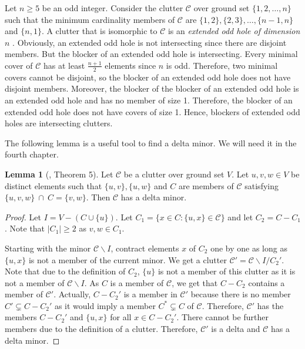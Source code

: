 \documentclass[a4paper, 12pt]{scrbook}
\theoremstyle{definition}
\newtheorem{lemma}[theorem]{Lemma}
\begin{document}
Let $n\geq 5$ be an odd integer.
Consider the clutter $\mathcal{C}$ over ground set $\{1,2,\ldots,n\}$ such that the minimum cardinality members of $\mathcal{C}$ are $\{1,2\},\{2,3\},\ldots,\{n-1,n\}$ and $\{n,1\}$.
A clutter that is isomorphic to $\mathcal{C}$ is an \emph{extended odd hole of dimension $n$} \cite{deltas}.
Obviously, an extended odd hole is not intersecting since there are disjoint members.
But the blocker of an extended odd hole is intersecting.
Every minimal cover of $\mathcal{C}$ has at least $\frac{n+1}2$ elements since $n$ is odd.
Therefore, two minimal covers cannot be disjoint, so the blocker of an extended odd hole does not have disjoint members.
Moreover, the blocker of the blocker of an extended odd hole is an extended odd hole and has no member of size 1.
Therefore, the blocker of an extended odd hole does not have covers of size 1.
Hence, blockers of extended odd holes are intersecting clutters.
\newline

The following lemma is a useful tool to find a delta minor. We will need it in the fourth chapter.
\begin{lemma}[\cite{deltas}, Theorem 5]\label{finddelta}
    Let $\mathcal{C}$ be a clutter over ground set $V$. Let $u,v,w \in V$ be distinct elements such that $\{u,v\}, \{u,w\}$ and $C$ are members of $\mathcal{C}$ satisfying $\{u,v,w\}~\cap~C = \{v,w\}$. Then $\mathcal{C}$ has a delta minor.
\end{lemma}

\begin{proof}
    Let $I=V-(C \cup \{u\})$. Let $C_1 = \{x \in C: \{u,x\} \in \mathcal{C}\}$ and let $C_2=C-C_1$. Note that $|C_1|\geq 2$ as $v,w \in C_1$.

    Starting with the minor $\mathcal{C} \backslash I$, contract elements $x$ of $C_2$ one by one as long as $\{u,x\}$ is not a member of the current minor.
    We get a clutter $\mathcal{C'}=\mathcal{C} \backslash I/C_2'$.
    Note that due to the definition of $C_2$, $\{u\}$ is not a member of this clutter as it is not a member of $\mathcal{C} \backslash I$.
    As $C$ is a member of $\mathcal{C}$, we get that $C-C_2$ contains a member of $\mathcal{C'}$.
    Actually, $C-C_2'$ is a member in $\mathcal{C'}$ because there is no member $C' \subsetneq C-C_2'$ as it would imply a member $C^* \subsetneq C$ of $\mathcal{C}$.
    Therefore, $\mathcal{C'}$ has the members $C-C_2'$ and $\{u,x\}$ for all $x \in C-C_2'$. There cannot be further members due to the definition of a clutter. Therefore, $\mathcal{C'}$ is a delta and $\mathcal{C}$ has a delta minor.
\end{proof}
\end{document}
